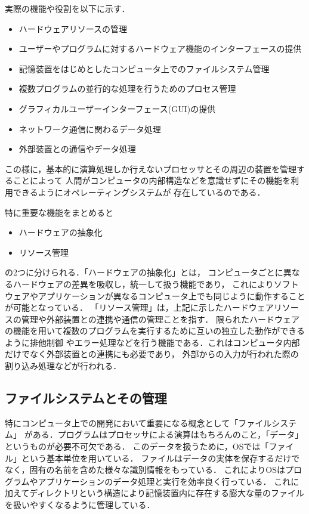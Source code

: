 \documentclass[autodetect-engine,dvi=dvipdfmx,ja=standard,a4j]{bxjsarticle}
\begin{document}
実際の機能や役割を以下に示す．
\begin{itemize}
    \item ハードウェアリソースの管理
    \item ユーザーやプログラムに対するハードウェア機能のインターフェースの提供
    \item 記憶装置をはじめとしたコンピュータ上でのファイルシステム管理
    \item 複数プログラムの並行的な処理を行うためのプロセス管理
    \item グラフィカルユーザーインターフェース(GUI)の提供
    \item ネットワーク通信に関わるデータ処理
    \item 外部装置との通信やデータ処理
\end{itemize}
この様に，基本的に演算処理しか行えないプロセッサとその周辺の装置を管理することによって
人間がコンピュータの内部構造などを意識せずにその機能を利用できるようにオペレーティングシステムが
存在しているのである．

特に重要な機能をまとめると
\begin{itemize}
    \item ハードウェアの抽象化
    \item リソース管理
\end{itemize}
の2つに分けられる．「ハードウェアの抽象化」とは，
コンピュータごとに異なるハードウェアの差異を吸収し，統一して扱う機能であり，
これによりソフトウェアやアプリケーションが異なるコンピュータ上でも同じように動作することが可能となっている．
「リソース管理」は，上記に示したハードウェアリソースの管理や外部装置との連携や通信の管理ことを指す．
限られたハードウェアの機能を用いて複数のプログラムを実行するために互いの独立した動作ができるように排他制御
やエラー処理などを行う機能である．これはコンピュータ内部だけでなく外部装置との連携にも必要であり，
外部からの入力が行われた際の割り込み処理などが行われる．

\subsection{ファイルシステムとその管理}
特にコンピュータ上での開発において重要になる概念として「ファイルシステム」
がある．プログラムはプロセッサによる演算はもちろんのこと，「データ」というものが必要不可欠である．
このデータを扱うために，OSでは「ファイル」という基本単位を用いている．
ファイルはデータの実体を保存するだけでなく，固有の名前を含めた様々な識別情報をもっている．
これによりOSはプログラムやアプリケーションのデータ処理と実行を効率良く行っている．
これに加えてディレクトリという構造により記憶装置内に存在する膨大な量のファイルを扱いやすくなるように管理している．
\end{document}
